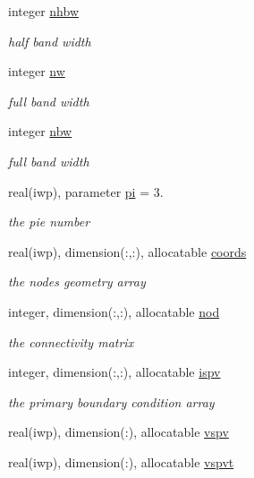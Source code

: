 \begin{DoxyCompactItemize}
integer \hyperlink{classfem__geometry_ab76fe1edb12c82677b620fdf4202cd58}{nhbw}
\begin{DoxyCompactList}\small\item\em half band width \end{DoxyCompactList}\item 
integer \hyperlink{classfem__geometry_a3210309ce3a4780b35fc7177624fd346}{nw}
\begin{DoxyCompactList}\small\item\em full band width \end{DoxyCompactList}\item 
integer \hyperlink{classfem__geometry_a7015292b75c4849ffe1c158263c47dd9}{nbw}
\begin{DoxyCompactList}\small\item\em full band width \end{DoxyCompactList}\item 
real(iwp), parameter \hyperlink{classfem__geometry_ae0111b7a7d03ad788204159aab5ad643}{pi} = 3.
\begin{DoxyCompactList}\small\item\em the pie number \end{DoxyCompactList}\item 
real(iwp), dimension(\+:,\+:), allocatable \hyperlink{classfem__geometry_ad74fb946f3d6ddc2d5c295614927ef99}{coords}
\begin{DoxyCompactList}\small\item\em the nodes geometry array \end{DoxyCompactList}\item 
integer, dimension(\+:,\+:), allocatable \hyperlink{classfem__geometry_ae04fc7c0625da6808be910120c2ba8f5}{nod}
\begin{DoxyCompactList}\small\item\em the connectivity matrix \end{DoxyCompactList}\item 
integer, dimension(\+:,\+:), allocatable \hyperlink{classfem__geometry_af6fe274e6f297c581b171d1b2e03372c}{ispv}
\begin{DoxyCompactList}\small\item\em the primary boundary condition array \end{DoxyCompactList}\item 
real(iwp), dimension(\+:), allocatable \hyperlink{classfem__geometry_a4f9dbcb2e6ba0f44baca0b6097aecbf3}{vspv}
\item 
real(iwp), dimension(\+:), allocatable \hyperlink{classfem__geometry_a549800c8fc00402740941a8af20e7484}{vspvt}

\end{DoxyCompactItemize}
